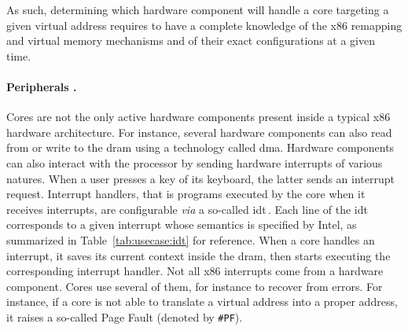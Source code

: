 As such, determining which hardware component will handle a core \IO targeting a
given virtual address requires to have a complete knowledge of the x86 remapping
and virtual memory mechanisms and of their exact configurations at a given time.

\paragraph{Peripherals \IOs.}
%
Cores are not the only active hardware components present inside a typical x86
hardware architecture.
%
For instance, several hardware components can also read from or write to the
\ac{dram} using a technology called \ac{dma}.
%
Hardware components can also interact with the processor by sending hardware
interrupts of various natures.
%
When a user presses a key of its keyboard, the latter sends an interrupt
request.
%
Interrupt handlers, that is programs executed by the core when it receives
interrupts, are configurable \emph{via} a so-called \ac{idt}\,\cite[Volume 3,
Chapter 6]{intel2014manual}.
%
Each line of the \ac{idt} corresponds to a given interrupt whose semantics is
specified by Intel, as summarized in Table~\ref{tab:usecase:idt} for reference.
%
When a core handles an interrupt, it saves its current context inside the
\ac{dram}, then starts executing the corresponding interrupt handler.
%
Not all x86 interrupts come from a hardware component.
%
Cores use several of them, for instance to recover from errors.
%
For instance, if a core is not able to translate a virtual address into a proper
address, it raises a so-called Page Fault (denoted by \texttt{\#PF}).

